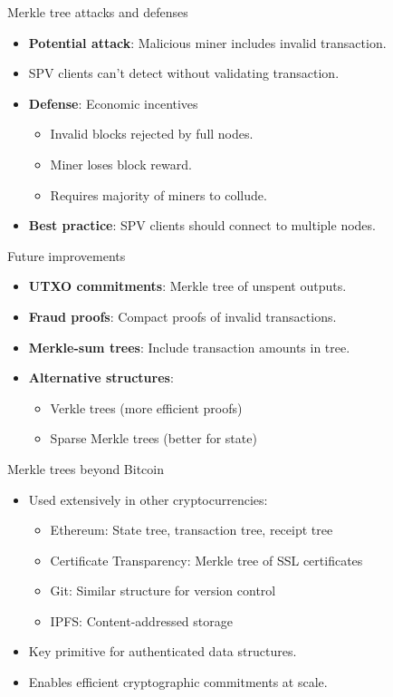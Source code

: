 \documentclass[aspectratio=169, lualatex, handout]{beamer}
\begin{document}
\begin{frame}{Merkle tree attacks and defenses}
	\begin{itemize}
		\item \textbf{Potential attack}: Malicious miner includes invalid transaction.
		\item SPV clients can't detect without validating transaction.
		\item \textbf{Defense}: Economic incentives
		      \begin{itemize}
			      \item Invalid blocks rejected by full nodes.
			      \item Miner loses block reward.
			      \item Requires majority of miners to collude.
		      \end{itemize}
		\item \textbf{Best practice}: SPV clients should connect to multiple nodes.
	\end{itemize}
\end{frame}

\begin{frame}{Future improvements}
	\begin{itemize}
		\item \textbf{UTXO commitments}: Merkle tree of unspent outputs.
		\item \textbf{Fraud proofs}: Compact proofs of invalid transactions.
		\item \textbf{Merkle-sum trees}: Include transaction amounts in tree.
		\item \textbf{Alternative structures}:
		      \begin{itemize}
			      \item Verkle trees (more efficient proofs)
			      \item Sparse Merkle trees (better for state)
		      \end{itemize}
	\end{itemize}
\end{frame}

\begin{frame}{Merkle trees beyond Bitcoin}
	\begin{itemize}
		\item Used extensively in other cryptocurrencies:
		      \begin{itemize}
			      \item Ethereum: State tree, transaction tree, receipt tree
			      \item Certificate Transparency: Merkle tree of SSL certificates
			      \item Git: Similar structure for version control
			      \item IPFS: Content-addressed storage
		      \end{itemize}
		\item Key primitive for authenticated data structures.
		\item Enables efficient cryptographic commitments at scale.
	\end{itemize}
\end{frame}
\end{document}
